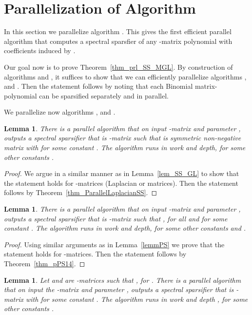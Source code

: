 \documentclass[11pt]{article}
\newcommand{\mylemma}[2]{\begin{lem}\label{lem:#1}#2\end{lem}}
\newtheorem{lem}[thm]{Lemma}
\numberwithin{thm}{section}
\begin{document}
\section{Parallelization of Algorithm }\label{sec:effPrlAlg}

In this section we parallelize algorithm . This gives the first efficient parallel algorithm that computes a spectral sparsfier of any -matrix polynomial with coefficients induced by .

Our goal now is to prove Theorem~\ref{thm_prl_SS_MGL}. By construction of algorithms  and , it suffices to show that we can efficiently parallelize algorithms ,  and . Then the statement follows by noting that each  Binomial matrix-polynomial can be sparsified separately and in parallel.

We parallelize now algorithms ,  and .

\begin{lem}\label{lem_pKLC}
There is a parallel algorithm 
that on input -matrix  and parameter
, outputs a spectral sparsifier  that is -matrix such that 
is symmetric non-negative matrix with  for some constant . The algorithm runs in  work and  depth, for some other constants .
\end{lem}

\begin{proof}
We argue in a similar manner as in Lemma~\ref{lem_SS_GL} to show that the statement holds for -matrices (Laplacian or  matrices). Then the statement follows by Theorem~\ref{thm_ParallelLaplacianSS}.
\end{proof}

\begin{lem}\label{lem_pPS}
There is a parallel algorithm  that on input -matrix  and parameter , outputs a spectral sparsifier  that is -matrix such that ,  for all  and  for some constant . The algorithm runs in  work and  depth, for some other constants  and .
\end{lem}

\begin{proof}
Using similar arguments as in Lemma~\ref{lemmPS} we prove that the statement holds for -matrices. Then the statement follows by Theorem~\ref{thm_pPS14}.
\end{proof}

\newcommand{\lempSqrSSREC}
{
Let  and 
are -matrices such that , for . There is a parallel algorithm 
that on input the -matrix 
and parameter , outputs a spectral sparsifier  that is -matrix with  for some constant . The algorithm runs in work  and depth , for some other constants .
}
\mylemma{lempSqrSSREC}{\lempSqrSSREC}
\end{document}
